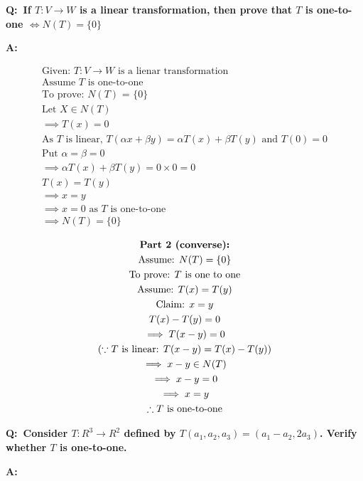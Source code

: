 \documentclass[english,course,fleqn]{lecture}
\newenvironment{qanda}{\setlength{\parindent}{0pt}}{\bigskip}
\newcommand{\Q}{\bigskip\bfseries Q:\ }
\newcommand{\A}{\par\textbf{A:} \normalfont}
\begin{document}
\begin{qanda}
  
  \Q If $T:V\rightarrow W$ is a linear transformation, then prove that $T$ is one-to-one $\iff N(T) = \{0\}$

  \A

  \begin{gather*}
    \text{Given: } T:V\rightarrow W \text{ is a lienar transformation}\\
    \text{Assume $T$ is one-to-one}\\
    \text{To prove: $N(T)$ = \{0\}}\\
    \text{Let $X\in N(T)$}\\
    \implies T(x) = 0\\
    \text{As $T$ is linear, $T(\alpha x + \beta y) = \alpha T(x) + \beta T(y)$ and $T(0) = 0$}\\
    \text{Put }\alpha = \beta = 0\\
    \implies \alpha T(x) + \beta T(y) = 0 \times 0 = 0\\
    T(x) = T(y)\\
    \implies x = y\\
    \implies x = 0 \text{ as $T$ is one-to-one}\\
    \implies N(T) = \{0\}
  \end{gather*}

  \begin{gather*}
    \text{\textbf{Part 2 (converse):}}\\
    \text{Assume: $N(T) = \{0\}$}\\
    \text{To prove: $T$ is one to one}\\
    \text{Assume: $T(x) = T(y)$}\\
    \text{Claim: $x = y$}\\
    T(x) - T(y) = 0\\
    \implies T(x-y) = 0\\
    (\because T \text{ is linear: } T(x-y) = T(x) - T(y))\\
    \implies x-y \in N(T)\\
    \implies x-y = 0\\
    \implies x = y\\
    \therefore \text{$T$ is one-to-one}
  \end{gather*}


  \Q Consider $T:R^{3} \rightarrow R^{2}$ defined by $T(a_{1}, a_{2}, a_{3}) = (a_{1} - a_{2}, 2 a_{3})$.
  Verify whether $T$ is one-to-one.

  \A 



\end{qanda}
\end{document}
